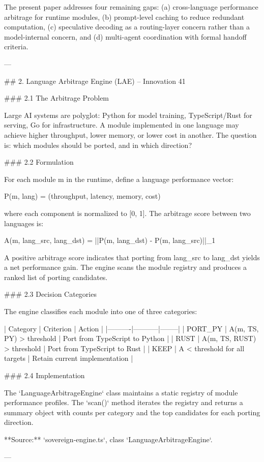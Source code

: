 The present paper addresses four remaining gaps: (a) cross-language performance arbitrage for runtime modules, (b) prompt-level caching to reduce redundant computation, (c) speculative decoding as a routing-layer concern rather than a model-internal concern, and (d) multi-agent coordination with formal handoff criteria.

---

## 2. Language Arbitrage Engine (LAE) -- Innovation 41

### 2.1 The Arbitrage Problem

Large AI systems are polyglot: Python for model training, TypeScript/Rust for serving, Go for infrastructure. A module implemented in one language may achieve higher throughput, lower memory, or lower cost in another. The question is: which modules should be ported, and in which direction?

### 2.2 Formulation

For each module m in the runtime, define a language performance vector:

P(m, lang) = (throughput, latency, memory, cost)

where each component is normalized to [0, 1]. The arbitrage score between two languages is:

A(m, lang_src, lang_dst) = ||P(m, lang_dst) - P(m, lang_src)||_1

A positive arbitrage score indicates that porting from lang_src to lang_dst yields a net performance gain. The engine scans the module registry and produces a ranked list of porting candidates.

### 2.3 Decision Categories

The engine classifies each module into one of three categories:

| Category | Criterion | Action |
|----------|-----------|--------|
| PORT_PY | A(m, TS, PY) > threshold | Port from TypeScript to Python |
| RUST | A(m, TS, RUST) > threshold | Port from TypeScript to Rust |
| KEEP | A < threshold for all targets | Retain current implementation |

### 2.4 Implementation

The `LanguageArbitrageEngine` class maintains a static registry of module performance profiles. The `scan()` method iterates the registry and returns a summary object with counts per category and the top candidates for each porting direction.

**Source:** `sovereign-engine.ts`, class `LanguageArbitrageEngine`.

---

